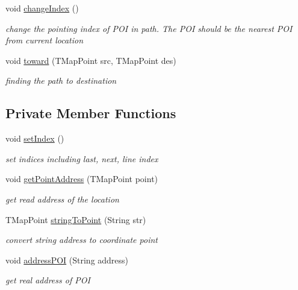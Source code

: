 \begin{DoxyCompactItemize}
void \mbox{\hyperlink{classhi_1_1world_1_1hello_1_1myapplication_1_1_road_guide_a1630eb12d7c616ab290bbefd31b412c4}{change\+Index}} ()
\begin{DoxyCompactList}\small\item\em change the pointing index of P\+OI in path. The P\+OI should be the nearest P\+OI from current location \end{DoxyCompactList}\item 
void \mbox{\hyperlink{classhi_1_1world_1_1hello_1_1myapplication_1_1_road_guide_af87d3224240ef90fcb995287620684d7}{toward}} (T\+Map\+Point src, T\+Map\+Point des)
\begin{DoxyCompactList}\small\item\em finding the path to destination \end{DoxyCompactList}\end{DoxyCompactItemize}
\subsection*{Private Member Functions}
\begin{DoxyCompactItemize}
\item 
void \mbox{\hyperlink{classhi_1_1world_1_1hello_1_1myapplication_1_1_road_guide_a8125d240bc324c49dca37ed23beb732c}{set\+Index}} ()
\begin{DoxyCompactList}\small\item\em set indices including last, next, line index \end{DoxyCompactList}\item 
void \mbox{\hyperlink{classhi_1_1world_1_1hello_1_1myapplication_1_1_road_guide_ad2c16f57da4010717fc637faa75d45ca}{get\+Point\+Address}} (T\+Map\+Point point)
\begin{DoxyCompactList}\small\item\em get read address of the location \end{DoxyCompactList}\item 
T\+Map\+Point \mbox{\hyperlink{classhi_1_1world_1_1hello_1_1myapplication_1_1_road_guide_ac4a16eda56bb3cfbd5d4d3bf02a983c9}{string\+To\+Point}} (String str)
\begin{DoxyCompactList}\small\item\em convert string address to coordinate point \end{DoxyCompactList}\item 
void \mbox{\hyperlink{classhi_1_1world_1_1hello_1_1myapplication_1_1_road_guide_ae6a5b107e6391950548cb7f5c82eb728}{address\+P\+OI}} (String address)
\begin{DoxyCompactList}\small\item\em get real address of P\+OI \end{DoxyCompactList}\end{DoxyCompactItemize}
